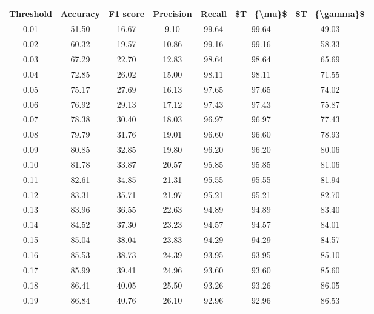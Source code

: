 \begin{tabular}{|c|c|c|c|c|c|c|}
\hline
 Threshold &  Accuracy &  F1 score &  Precision &  Recall &  \$T\_\{\textbackslash mu\}\$ &  \$T\_\{\textbackslash gamma\}\$ \\
\hline
      0.01 &     51.50 &     16.67 &       9.10 &   99.64 &      99.64 &         49.03 \\
      0.02 &     60.32 &     19.57 &      10.86 &   99.16 &      99.16 &         58.33 \\
      0.03 &     67.29 &     22.70 &      12.83 &   98.64 &      98.64 &         65.69 \\
      0.04 &     72.85 &     26.02 &      15.00 &   98.11 &      98.11 &         71.55 \\
      0.05 &     75.17 &     27.69 &      16.13 &   97.65 &      97.65 &         74.02 \\
      0.06 &     76.92 &     29.13 &      17.12 &   97.43 &      97.43 &         75.87 \\
      0.07 &     78.38 &     30.40 &      18.03 &   96.97 &      96.97 &         77.43 \\
      0.08 &     79.79 &     31.76 &      19.01 &   96.60 &      96.60 &         78.93 \\
      0.09 &     80.85 &     32.85 &      19.80 &   96.20 &      96.20 &         80.06 \\
      0.10 &     81.78 &     33.87 &      20.57 &   95.85 &      95.85 &         81.06 \\
      0.11 &     82.61 &     34.85 &      21.31 &   95.55 &      95.55 &         81.94 \\
      0.12 &     83.31 &     35.71 &      21.97 &   95.21 &      95.21 &         82.70 \\
      0.13 &     83.96 &     36.55 &      22.63 &   94.89 &      94.89 &         83.40 \\
      0.14 &     84.52 &     37.30 &      23.23 &   94.57 &      94.57 &         84.01 \\
      0.15 &     85.04 &     38.04 &      23.83 &   94.29 &      94.29 &         84.57 \\
      0.16 &     85.53 &     38.73 &      24.39 &   93.95 &      93.95 &         85.10 \\
      0.17 &     85.99 &     39.41 &      24.96 &   93.60 &      93.60 &         85.60 \\
      0.18 &     86.41 &     40.05 &      25.50 &   93.26 &      93.26 &         86.05 \\
      0.19 &     86.84 &     40.76 &      26.10 &   92.96 &      92.96 &         86.53 \\

\end{tabular}
